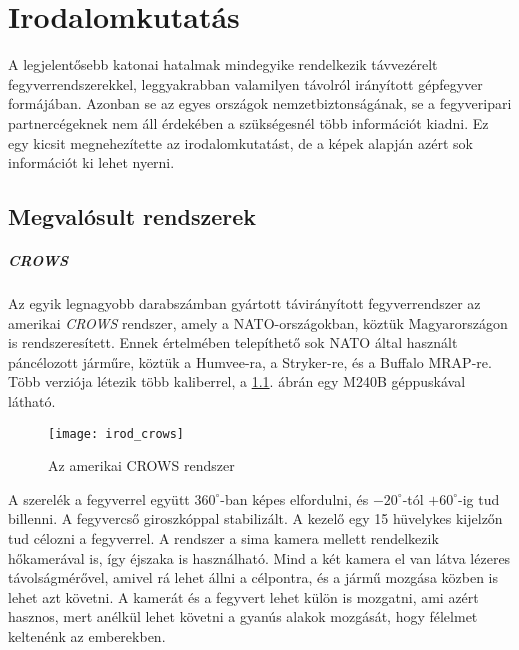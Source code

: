 \chapter{Irodalomkutatás}

A legjelentősebb katonai hatalmak mindegyike rendelkezik távvezérelt fegyverrendszerekkel, leggyakrabban valamilyen távolról irányított gépfegyver formájában. Azonban se az egyes országok nemzetbiztonságának, se a fegyveripari partnercégeknek nem áll érdekében a szükségesnél több információt kiadni. Ez egy kicsit megnehezítette az irodalomkutatást, de a képek alapján azért sok információt ki lehet nyerni.

\section{Megvalósult rendszerek} \label{sec:valos}

\paragraph{CROWS \cite{crows}}
Az egyik legnagyobb darabszámban gyártott távirányított fegyverrendszer az amerikai \textsl{CROWS} rendszer, amely a NATO-országokban, köztük Magyarországon is rendszeresített. Ennek értelmében telepíthető sok NATO által használt páncélozott járműre, köztük a Humvee-ra, a Stryker-re, és a Buffalo MRAP-re. Több verziója létezik több kaliberrel, a \ref{fig:irod_crows}. ábrán egy M240B géppuskával látható.\\

\begin{figure}[h!]
	\centering
	\texttt{[image: irod\_crows]}
	\caption{Az amerikai CROWS rendszer \cite{crows}}
	\label{fig:irod_crows}
\end{figure}

A szerelék a fegyverrel együtt $360^\circ$-ban képes elfordulni, és $-20^{\circ}$-tól $+60^{\circ}$-ig tud billenni. A fegyvercső giroszkóppal stabilizált. A kezelő egy 15 hüvelykes kijelzőn tud célozni a fegyverrel. A rendszer a sima kamera mellett rendelkezik hőkamerával is, így éjszaka is használható. Mind a két kamera el van látva lézeres távolságmérővel, amivel rá lehet állni a célpontra, és a jármű mozgása közben is lehet azt követni. A kamerát és a fegyvert lehet külön is mozgatni, ami azért hasznos, mert anélkül lehet követni a gyanús alakok mozgását, hogy félelmet keltenénk az emberekben.

